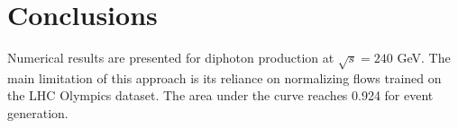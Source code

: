 \section{Conclusions}\label{sec:conclusions}

Numerical results are presented for diphoton production at $\sqrt{s} =
240$ GeV. The main limitation of this approach is its reliance on
normalizing flows trained on the LHC Olympics dataset. The area under
the curve reaches 0.924 for event generation.


